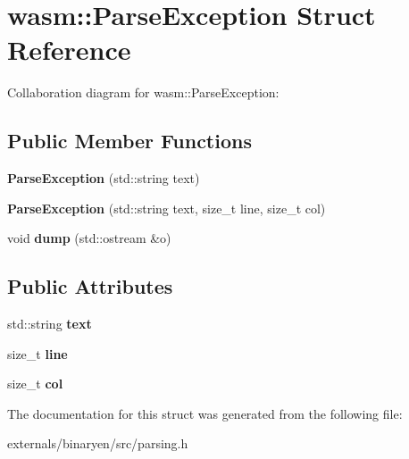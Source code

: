 \hypertarget{structwasm_1_1_parse_exception}{}\section{wasm\+:\+:Parse\+Exception Struct Reference}
\label{structwasm_1_1_parse_exception}


Collaboration diagram for wasm\+:\+:Parse\+Exception\+:
\subsection*{Public Member Functions}
\begin{DoxyCompactItemize}
\item 
\mbox{\label{structwasm_1_1_parse_exception_af805dcd4696aec5118e2c3c4573916f1}} 
{\bfseries Parse\+Exception} (std\+::string text)
\item 
\mbox{\label{structwasm_1_1_parse_exception_a5a45afeafaefef89a23325fb57b3e7db}} 
{\bfseries Parse\+Exception} (std\+::string text, size\+\_\+t line, size\+\_\+t col)
\item 
\mbox{\label{structwasm_1_1_parse_exception_aad0b41e6171d280f54bbfca6850a8b95}} 
void {\bfseries dump} (std\+::ostream \&o)
\end{DoxyCompactItemize}
\subsection*{Public Attributes}
\begin{DoxyCompactItemize}
\item 
\mbox{\label{structwasm_1_1_parse_exception_a79129f4c71c2f5d07c69fa2507859617}} 
std\+::string {\bfseries text}
\item 
\mbox{\label{structwasm_1_1_parse_exception_a77375fd277084b41e0884fe6b4b88a01}} 
size\+\_\+t {\bfseries line}
\item 
\mbox{\label{structwasm_1_1_parse_exception_a14f4b9fbcdaac966201dedcae2e0eee3}} 
size\+\_\+t {\bfseries col}
\end{DoxyCompactItemize}


The documentation for this struct was generated from the following file\+:\begin{DoxyCompactItemize}
\item 
externals/binaryen/src/parsing.\+h\end{DoxyCompactItemize}
